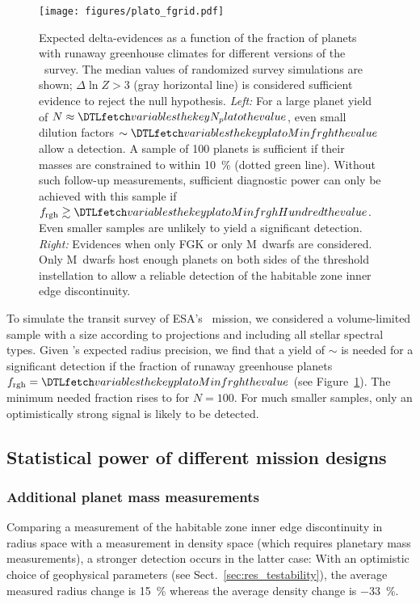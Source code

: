 \documentclass[twocolumn,twocolappendix]{aastex631}
\begin{document}
    \begin{figure*}[ht!]
        \begin{centering}
            \texttt{[image: figures/plato\_fgrid.pdf]}
            \caption{
            Expected delta-evidences as a function of the fraction of planets with runaway greenhouse climates for different versions of the \plato\ survey.
            The median values of randomized survey simulations are shown; $\Delta \ln Z > 3$ (gray horizontal line) is considered sufficient evidence to reject the null hypothesis.
            \textit{Left:} For a large planet yield of $N \approx \var{N_plato}$, even small dilution factors $\sim \var{platoMinfrgh}$ allow a detection.
                A sample of 100 planets is sufficient if their masses are constrained to within \SI{10}{\percent} (dotted green line).
                Without such follow-up measurements, sufficient diagnostic power can only be achieved with this sample if $f_\mathrm{rgh} \gtrsim \var{platoMinfrghHundred}$.
               Even smaller samples are unlikely to yield a significant detection.
            \textit{Right:} Evidences when only FGK or only M~dwarfs are considered.
                Only M~dwarfs host enough planets on both sides of the threshold instellation to allow a reliable detection of the habitable zone inner edge discontinuity.
            }
            \label{fig:plato_fgrid}
        \end{centering}
    \end{figure*}
To simulate the transit survey of ESA's \plato\ mission, we considered a volume-limited sample with a size according to projections and including all stellar spectral types.
Given \plato's expected radius precision, we find that a yield of $\sim$ is needed for a significant detection if the fraction of runaway greenhouse planets $ f_\mathrm{rgh} = \var{platoMinfrgh}$ (see Figure~\ref{fig:plato_fgrid}).
The minimum needed fraction rises to  for $N = 100$.
For much smaller samples, only an optimistically strong signal is likely to be detected.


\subsection{Statistical power of different mission designs}\label{sec:statpower_missions}

\subsubsection{Additional planet mass measurements}\label{sec:res_followup}
Comparing a measurement of the habitable zone inner edge discontinuity in radius space with a measurement in density space (which requires planetary mass measurements), a stronger detection occurs in the latter case:
With an optimistic choice of geophysical parameters (see Sect.~\ref{sec:res_testability}), the average measured radius change is \SI{+15}{\percent} whereas the average density change is \SI{-33}{\percent}.
\end{document}
